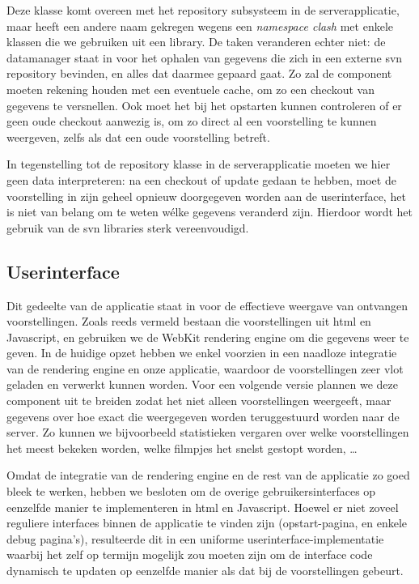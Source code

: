 Deze klasse komt overeen met het repository subsysteem in de serverapplicatie, maar heeft een andere naam gekregen wegens een \emph{namespace clash} met enkele klassen die we gebruiken uit een library. De taken veranderen echter niet: de datamanager staat in  voor het ophalen van gegevens die zich in een externe \ac{svn} repository bevinden, en alles dat daarmee gepaard gaat. Zo zal de component moeten rekening houden met een eventuele cache, om zo een checkout van gegevens te versnellen. Ook moet het bij het opstarten kunnen controleren of er geen oude checkout aanwezig is, om zo direct al een voorstelling te kunnen weergeven, zelfs als dat een oude voorstelling betreft.

In tegenstelling tot de repository klasse in de serverapplicatie moeten we hier geen data interpreteren: na een checkout of update gedaan te hebben, moet de voorstelling in zijn geheel opnieuw doorgegeven worden aan de userinterface, het is niet van belang om te weten wélke gegevens veranderd zijn. Hierdoor wordt het gebruik van de \ac{svn} libraries sterk vereenvoudigd.


\subsection{Userinterface}
\label{kiosk:structuur:userinterface}

Dit gedeelte van de applicatie staat in voor de effectieve weergave van ontvangen voorstellingen. Zoals reeds vermeld bestaan die voorstellingen uit \ac{html} en Javascript, en gebruiken we de WebKit rendering engine om die gegevens weer te geven. In de huidige opzet hebben we enkel voorzien in een naadloze integratie van de rendering engine en onze applicatie, waardoor de voorstellingen zeer vlot geladen en verwerkt kunnen worden. Voor een volgende versie plannen we deze component uit te breiden zodat het niet alleen voorstellingen weergeeft, maar gegevens over hoe exact die weergegeven worden teruggestuurd worden naar de server. Zo kunnen we bijvoorbeeld statistieken vergaren over welke voorstellingen het meest bekeken worden, welke filmpjes het snelst gestopt worden, \ldots

Omdat de integratie van de rendering engine en de rest van de applicatie zo goed bleek te werken, hebben we besloten om de overige gebruikersinterfaces op eenzelfde manier te implementeren in \ac{html} en Javascript. Hoewel er niet zoveel reguliere interfaces binnen de applicatie te vinden zijn (opstart-pagina, en enkele debug pagina's), resulteerde dit in een uniforme userinterface-implementatie waarbij het zelf op termijn mogelijk zou moeten zijn om de interface code dynamisch te updaten op eenzelfde manier als dat bij de voorstellingen gebeurt.

